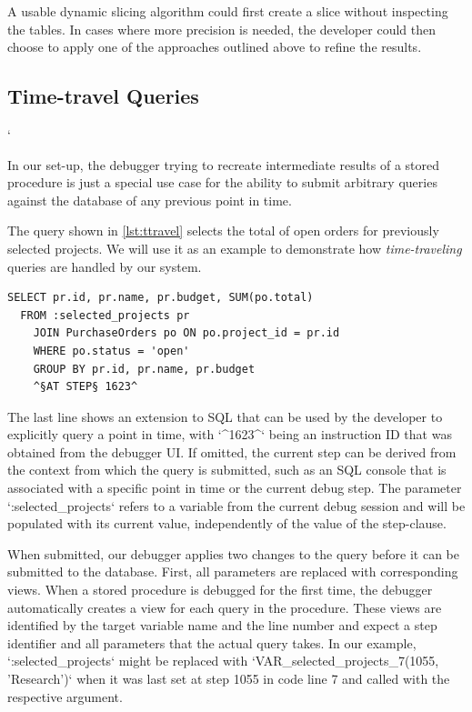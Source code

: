 \documentclass[english]{scrartcl}
\begin{document}
\medskip

\noindent
A usable dynamic slicing algorithm could first create a slice without inspecting the tables.
In cases where more precision is needed, the developer could then choose to apply one of the approaches outlined above to refine the results.

\subsection{Time-travel Queries}

\lstMakeShortInline[basicstyle=\ttfamily,language={Inline},breaklines=true]`

In our set-up, the debugger trying to recreate intermediate results of a stored procedure is just a special use case for the ability to submit arbitrary queries against the database of any previous point in time.

The query shown in \cref{lst:ttravel} selects the total of open orders for previously selected projects.
We will use it as an example to demonstrate how \emph{time-traveling} queries are handled by our system.

\begin{lstlisting}[language=HanaSQL,float,caption={Example for a time-travel query: Select the current total of open orders for previously selected projects},label=lst:ttravel]
  SELECT pr.id, pr.name, pr.budget, SUM(po.total)
  FROM :selected_projects pr
	JOIN PurchaseOrders po ON po.project_id = pr.id
	WHERE po.status = 'open'
	GROUP BY pr.id, pr.name, pr.budget
	^§AT STEP§ 1623^
\end{lstlisting}

The last line shows an extension to SQL that can be used by the developer to explicitly query a point in time, with `^1623^` being an instruction ID that was obtained from the debugger UI.
If omitted, the current step can be derived from the context from which the query is submitted, such as an SQL console that is associated with a specific point in time or the current debug step.
The parameter `:selected_projects` refers to a variable from the current debug session and will be populated with its current value, independently of the value of the step-clause.

When submitted, our debugger applies two changes to the query before it can be submitted to the database.
First, all parameters are replaced with corresponding views.
When a stored procedure is debugged for the first time, the debugger automatically creates a view for each query in the procedure.
These views are identified by the target variable name and the line number and expect a step identifier and all parameters that the actual query takes.
In our example, `:selected_projects` might be replaced with `VAR_selected_projects_7(1055, 'Research')` when it was last set at step 1055 in code line 7 and called with the respective argument.
\end{document}
